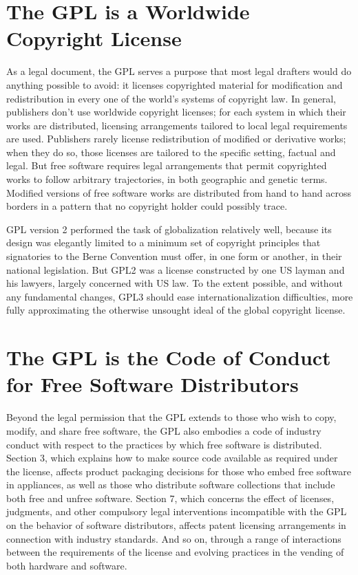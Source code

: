 \documentclass[11pt, letterpaper]{book}
\begin{document}
\section*{The GPL is a Worldwide Copyright License}

As a legal document, the GPL serves a purpose that most legal drafters
would do anything possible to avoid: it licenses copyrighted material
for modification and redistribution in every one of the world's
systems of copyright law.  In general, publishers don't use worldwide
copyright licenses; for each system in which their works are
distributed, licensing arrangements tailored to local legal
requirements are used.  Publishers rarely license redistribution of
modified or derivative works; when they do so, those licenses are
tailored to the specific setting, factual and legal.  But free
software requires legal arrangements that permit copyrighted works to
follow arbitrary trajectories, in both geographic and genetic terms.
Modified versions of free software works are distributed from hand to
hand across borders in a pattern that no copyright holder could
possibly trace.

GPL version 2 performed the task of globalization relatively well,
because its design was elegantly limited to a minimum set of copyright
principles that signatories to the Berne Convention must offer, in one
form or another, in their national legislation.  But GPL2 was a
license constructed by one US layman and his lawyers, largely
concerned with US law.  To the extent possible, and without any
fundamental changes, GPL3 should ease internationalization
difficulties, more fully approximating the otherwise unsought ideal of
the global copyright license.

\section*{The GPL is the Code of Conduct for Free Software Distributors}

Beyond the legal permission that the GPL extends to those who wish to
copy, modify, and share free software, the GPL also embodies a code of
industry conduct with respect to the practices by which free software
is distributed.  Section 3, which explains how to make source code
available as required under the license, affects product packaging
decisions for those who embed free software in appliances, as well as
those who distribute software collections that include both free and
unfree software.  Section 7, which concerns the effect of licenses,
judgments, and other compulsory legal interventions incompatible with
the GPL on the behavior of software distributors, affects patent
licensing arrangements in connection with industry standards.  And so
on, through a range of interactions between the requirements of the
license and evolving practices in the vending of both hardware and
software.
\end{document}
